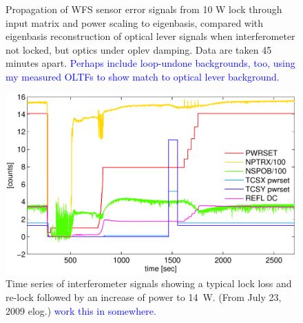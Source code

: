 \begin{figure}
\begin{centering}
\caption[Angular motion suppression due to the ASC]{Propagation of WFS
  sensor error signals from 10 W lock through input matrix and power
  scaling to eigenbasis, compared with eigenbasis reconstruction of
  optical lever signals when interferometer not locked, but optics
  under oplev damping. Data are taken 45 minutes
  apart. \textcolor{blue}{Perhaps include loop-undone backgrounds,
    too, using my measured OLTFs to show match to optical lever
    background.}}
\label{fig:}
\end{centering}
\end{figure}




\begin{figure}
\begin{centering}
\includegraphics[width=1.0\columnwidth]{figures/timeseries_ifolocked.pdf}
\caption[Striptool example]{Time series of interferometer signals
  showing a typical lock loss and re-lock followed by an increase of
  power to 14~W. (From July 23, 2009 elog.) \textcolor{blue}{work this
  in somewhere.}}
\label{fig:striptool}
\end{centering}
\end{figure}




